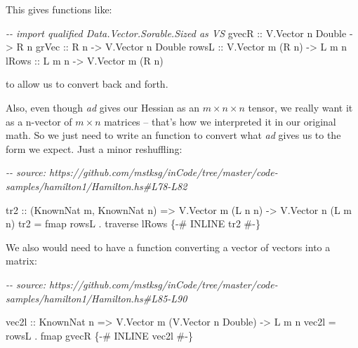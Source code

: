 \documentclass[]{article}
\newenvironment{Shaded}{}{}
\newcommand{\CommentTok}[1]{\textcolor[rgb]{0.38,0.63,0.69}{\textit{#1}}}
\newcommand{\DataTypeTok}[1]{\textcolor[rgb]{0.56,0.13,0.00}{#1}}
\newcommand{\FunctionTok}[1]{\textcolor[rgb]{0.02,0.16,0.49}{#1}}
\newcommand{\NormalTok}[1]{#1}
\newcommand{\OperatorTok}[1]{\textcolor[rgb]{0.40,0.40,0.40}{#1}}
\newcommand{\OtherTok}[1]{\textcolor[rgb]{0.00,0.44,0.13}{#1}}
\begin{document}
This gives functions like:

\begin{Shaded}
\begin{Highlighting}[]
\CommentTok{{-}{-} import qualified Data.Vector.Sorable.Sized as VS}
\OtherTok{gvecR ::} \DataTypeTok{V.Vector}\NormalTok{ n }\DataTypeTok{Double}  \OtherTok{{-}\textgreater{}} \DataTypeTok{R}\NormalTok{ n}
\OtherTok{grVec ::} \DataTypeTok{R}\NormalTok{ n                }\OtherTok{{-}\textgreater{}} \DataTypeTok{V.Vector}\NormalTok{ n }\DataTypeTok{Double}
\OtherTok{rowsL ::} \DataTypeTok{V.Vector}\NormalTok{ m (}\DataTypeTok{R}\NormalTok{ n)   }\OtherTok{{-}\textgreater{}} \DataTypeTok{L}\NormalTok{ m n}
\OtherTok{lRows ::} \DataTypeTok{L}\NormalTok{ m n              }\OtherTok{{-}\textgreater{}} \DataTypeTok{V.Vector}\NormalTok{ m (}\DataTypeTok{R}\NormalTok{ n)}
\end{Highlighting}
\end{Shaded}

to allow us to convert back and forth.

Also, even though \emph{ad} gives our Hessian as an \(m \times n \times
n\) tensor, we really want it as a n-vector of \(m \times n\) matrices -- that's
how we interpreted it in our original math. So we just need to write an function
to convert what \emph{ad} gives us to the form we expect. Just a minor
reshuffling:

\begin{Shaded}
\begin{Highlighting}[]
\CommentTok{{-}{-} source: https://github.com/mstksg/inCode/tree/master/code{-}samples/hamilton1/Hamilton.hs\#L78{-}L82}

\OtherTok{tr2 ::}\NormalTok{ (}\DataTypeTok{KnownNat}\NormalTok{ m, }\DataTypeTok{KnownNat}\NormalTok{ n)}
    \OtherTok{=\textgreater{}} \DataTypeTok{V.Vector}\NormalTok{ m (}\DataTypeTok{L}\NormalTok{ n n)}
    \OtherTok{{-}\textgreater{}} \DataTypeTok{V.Vector}\NormalTok{ n (}\DataTypeTok{L}\NormalTok{ m n)}
\NormalTok{tr2 }\OtherTok{=} \FunctionTok{fmap}\NormalTok{ rowsL }\OperatorTok{.} \FunctionTok{traverse}\NormalTok{ lRows}
\OtherTok{\{{-}\# INLINE tr2 \#{-}\}}
\end{Highlighting}
\end{Shaded}

We also would need to have a function converting a vector of vectors into a
matrix:

\begin{Shaded}
\begin{Highlighting}[]
\CommentTok{{-}{-} source: https://github.com/mstksg/inCode/tree/master/code{-}samples/hamilton1/Hamilton.hs\#L85{-}L90}

\NormalTok{vec2l}
\OtherTok{    ::} \DataTypeTok{KnownNat}\NormalTok{ n}
    \OtherTok{=\textgreater{}} \DataTypeTok{V.Vector}\NormalTok{ m (}\DataTypeTok{V.Vector}\NormalTok{ n }\DataTypeTok{Double}\NormalTok{)}
    \OtherTok{{-}\textgreater{}} \DataTypeTok{L}\NormalTok{ m n}
\NormalTok{vec2l }\OtherTok{=}\NormalTok{ rowsL }\OperatorTok{.} \FunctionTok{fmap}\NormalTok{ gvecR}
\OtherTok{\{{-}\# INLINE vec2l \#{-}\}}
\end{Highlighting}
\end{Shaded}
\end{document}
